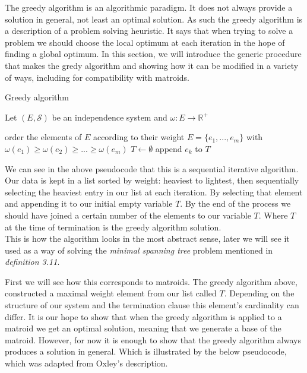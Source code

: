 \documentclass[../main.tex]{subfiles}
\begin{document}
The greedy algorithm is an algorithmic paradigm. It does not always provide a solution in general, not least an optimal solution. As such the greedy algorithm is a description of a problem solving heuristic.  It says that when trying to solve a problem we should choose the local optimum at each iteration in the hope of finding a global optimum. In this section, we will introduce the generic procedure that makes the gredy algorithm and showing how it can be modified in a variety of ways, including for compatibility with matroids.

\begin{algorithm}[H]
\caption{Greedy algorithm}\label{greedy}
Let $(E,\mathcal{S})$ be an independence system and $\omega:E \longrightarrow \mathbb{R^+}$
\begin{algorithmic}[1]
\State order the elements of $E$ according to their weight
\State $E = \{ e_1,...,e_m\}$ with $\omega(e_1) \geq \omega(e_2) \geq ... \geq \omega(e_m)$
\State $T\gets \emptyset$
	 	\State append $e_k$ to $T$
	\EndIf
\EndFor
\EndProcedure
\end{algorithmic}
\end{algorithm}

We can see in the above pseudocode that this is a sequential iterative algorithm. Our data is kept in a list sorted by weight: heaviest to lightest, then sequentially selecting the heaviest entry in our list at each iteration. By selecting that element and appending it to our initial empty variable $T.$ By the end of the process we should have joined a certain number of the elements to our variable $T.$ Where $T$ at the time of termination is the greedy algorithm solution.\\ This is how the algorithm looks in the most abstract sense, later we will see it used as a way of solving the \textit{minimal spanning tree} problem mentioned in \textit{definition 3.11}.

First we will see how this corresponds to matroids. The greedy algorithm above, constructed a maximal weight element from our list called $T.$ Depending on the structure of our system and the termination clause this element's cardinality can differ. It is our hope to show that when the greedy algorithm is applied to a matroid we get an optimal solution, meaning that we generate a base of the matroid. However, for now it is enough to show that the greedy algorithm always produces a solution in general. Which is illustrated by the below pseudocode, which was adapted from Oxley's\cite{ox_book} description.
\end{document}
